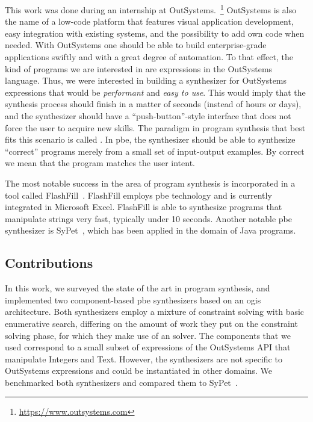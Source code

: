 This work was done during an internship at
OutSystems.~\footnote{\url{https://www.outsystems.com}} 
OutSystems is also the name of a low-code platform that features visual
application development, easy integration with existing systems, and the
possibility to add own code when needed.
With OutSystems one should be able to build enterprise-grade applications
swiftly and with a great degree of
automation.
To that effect, the kind of programs we are interested in are expressions in the
OutSystems language.
Thus, we were interested in building a synthesizer for OutSystems expressions
that would be \textit{performant} and \textit{easy to use}.
This would imply that the synthesis process should finish in a matter of seconds
(instead of hours or days), and the synthesizer should have a
``push-button''-style interface that does not force the user to acquire new
skills.
The paradigm in program synthesis that best fits this scenario is called
.
In \gls{pbe}, the synthesizer should be able to synthesize ``correct'' programs
merely from a small set of input-output examples.
By correct we mean that the program matches the user intent.

The most notable success in the area of program synthesis is incorporated in a
tool called FlashFill~\cite{Gulwani:2011}.
FlashFill employs \gls{pbe} technology and is currently integrated in Microsoft
Excel.
FlashFill is able to synthesize programs that manipulate strings very fast,
typically under 10 seconds.
Another notable \gls{pbe} synthesizer is SyPet~\cite{Feng:2017:CSC}, which has
been applied in the domain of Java programs.

\subsection{Contributions}

In this work, we surveyed the state of the art in program synthesis, and
implemented two component-based \gls{pbe} synthesizers based on an \gls{ogis}
architecture.
Both synthesizers employ a mixture of constraint solving with basic enumerative
search, differing on the amount of work they put on the constraint solving
phase, for which they make use of an  solver.
The components that we used correspond to a small subset of expressions of the
OutSystems API that manipulate Integers and Text.
However, the synthesizers are not specific to OutSystems expressions and could
be instantiated in other domains.
We benchmarked both synthesizers and compared them to SyPet~\cite{Feng:2017:CSC}.